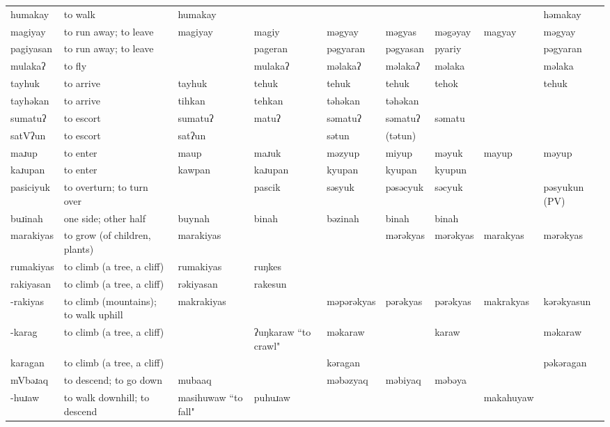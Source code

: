 \begin{landscape}
\begin{longtable}{*{9}{p{}}}
\text{*}humakay & to walk & humakay &  &  &  &  &  & həmakay\\
\text{*}magiyay & to run away; to leave & magiyay & magiy & məgyay & məgyas & məgəyay & magyay & məgyay\\
\text{*}pagiyasan & to run away; to leave &  & pageran & pəgyaran & pəgyasan & pyariy &  & pəgyaran\\
\text{*}mulakaʔ & to fly &  & mulakaʔ & məlakaʔ & məlakaʔ & məlaka &  & məlaka\\
\text{*}tayhuk & to arrive & tayhuk & tehuk & tehuk & tehuk & tehok &  & tehuk\\
\text{*}tayhəkan & to arrive & tihkan & tehkan & təhəkan & təhəkan &  &  & \\
\text{*}sumatuʔ & to escort & sumatuʔ & matuʔ & səmatuʔ & səmatuʔ & səmatu &  & \\
\text{*}satVʔun & to escort & satʔun &  & sətun & (tətun) &  &  & \\
\text{*}maɹup & to enter & maup & maɹuk & məzyup & miyup & məyuk & mayup & məyup\\
\text{*}kaɹupan & to enter & kawpan & kaɹupan & kyupan & kyupan & kyupun &  & \\
\text{*}pasiciyuk & to overturn; to turn over &  & pascik & səsyuk & pəsəcyuk & səcyuk &  & pəsyukun (PV)\\
\text{*}buɹinah & one side; other half & buynah & binah & bəzinah & binah & binah &  & \\
\text{*}marakiyas & to grow (of children, plants) & marakiyas &  &  & mərəkyas & mərəkyas & marakyas & mərəkyas\\
\text{*}rumakiyas & to climb (a tree, a cliff) & rumakiyas & ruŋkes &  &  &  &  & \\
\text{*}rakiyasan & to climb (a tree, a cliff) & rəkiyasan & rakesun &  &  &  &  & \\
\text{*}-rakiyas & to climb (mountains); to walk uphill & makrakiyas &  & məpərəkyas & pərəkyas & pərəkyas & makrakyas & kərəkyasun\\
\text{*}-karag & to climb (a tree, a cliff) &  & ʔuŋkaraw ``to crawl" & məkaraw &  & karaw &  & məkaraw\\
\text{*}karagan & to climb (a tree, a cliff) &  &  & kəragan &  &  &  & pəkəragan\\
\text{*}mVbəɹaq & to descend; to go down & mubaaq &  & məbəzyaq & məbiyaq & məbəya &  & \\
\text{*}-huɹaw & to walk downhill; to descend & masihuwaw ``to fall" & puhuɹaw &  &  &  & makahuyaw & \\

\end{longtable}
\end{landscape}
